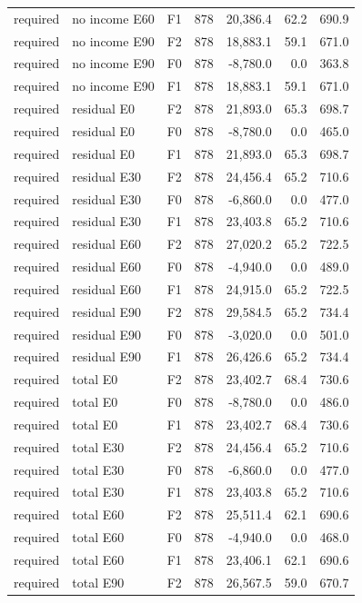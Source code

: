 \begin{longtable}{p{1.8cm}p{3.35cm}lrrrr}
required & no income E60 & F1 & 878 & 20,386.4 & 62.2 & 690.9\\
required & no income E90 & F2 & 878 & 18,883.1 & 59.1 & 671.0\\
required & no income E90 & F0 & 878 & -8,780.0 & 0.0 & 363.8\\
required & no income E90 & F1 & 878 & 18,883.1 & 59.1 & 671.0\\
required & residual E0 & F2 & 878 & 21,893.0 & 65.3 & 698.7\\
required & residual E0 & F0 & 878 & -8,780.0 & 0.0 & 465.0\\
required & residual E0 & F1 & 878 & 21,893.0 & 65.3 & 698.7\\
required & residual E30 & F2 & 878 & 24,456.4 & 65.2 & 710.6\\
required & residual E30 & F0 & 878 & -6,860.0 & 0.0 & 477.0\\
required & residual E30 & F1 & 878 & 23,403.8 & 65.2 & 710.6\\
required & residual E60 & F2 & 878 & 27,020.2 & 65.2 & 722.5\\
required & residual E60 & F0 & 878 & -4,940.0 & 0.0 & 489.0\\
required & residual E60 & F1 & 878 & 24,915.0 & 65.2 & 722.5\\
required & residual E90 & F2 & 878 & 29,584.5 & 65.2 & 734.4\\
required & residual E90 & F0 & 878 & -3,020.0 & 0.0 & 501.0\\
required & residual E90 & F1 & 878 & 26,426.6 & 65.2 & 734.4\\
required & total E0 & F2 & 878 & 23,402.7 & 68.4 & 730.6\\
required & total E0 & F0 & 878 & -8,780.0 & 0.0 & 486.0\\
required & total E0 & F1 & 878 & 23,402.7 & 68.4 & 730.6\\
required & total E30 & F2 & 878 & 24,456.4 & 65.2 & 710.6\\
required & total E30 & F0 & 878 & -6,860.0 & 0.0 & 477.0\\
required & total E30 & F1 & 878 & 23,403.8 & 65.2 & 710.6\\
required & total E60 & F2 & 878 & 25,511.4 & 62.1 & 690.6\\
required & total E60 & F0 & 878 & -4,940.0 & 0.0 & 468.0\\
required & total E60 & F1 & 878 & 23,406.1 & 62.1 & 690.6\\
required & total E90 & F2 & 878 & 26,567.5 & 59.0 & 670.7\\

\end{longtable}
